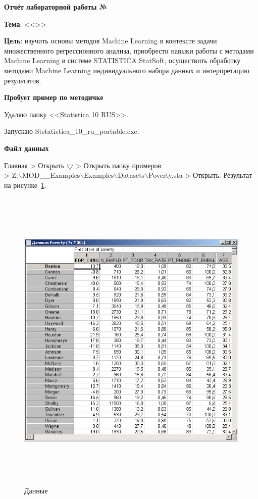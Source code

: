 \begin{center}
  \textbf{Отчёт лабораторной работы №\envReportLabNumber}
\end{center}

\textbf{Тема}:
<<\envReportTitle>>

\textbf{Цель}:
изучить основы методов Machine Learning в контексте задачи
множественного регрессионного анализа,
приобрести навыки работы с методами Machine Learning в системе STATISTICA StatSoft,
осуществить обработку методами Machine Learning индивидуального набора данных и интерпретацию результатов.

{}

\begin{center}
  \textbf{Пробует пример по методичке}
\end{center}

Удаляю папку <<Statistica 10 RUS>>.

Запускаю Ststatistica\_10\_ru\_portable.exe.

\begin{center}
  \textbf{Файл данных}
\end{center}

Главная > Открыть $\bigtriangledown$ > Открыть папку примеров\\
> Z:$\backslash$MOD\_\_Examples$\backslash$Examples$\backslash$Datasets$\backslash$Poverty.sta
> Открыть. Результат на рисунке~\ref{fig:example_1}.

\begin{figure}[!h]
  \centering

  \includegraphics[height=15cm]
  {inc/example_1.PNG}

  \caption{Данные}

  \label{fig:example_1}
\end{figure}

